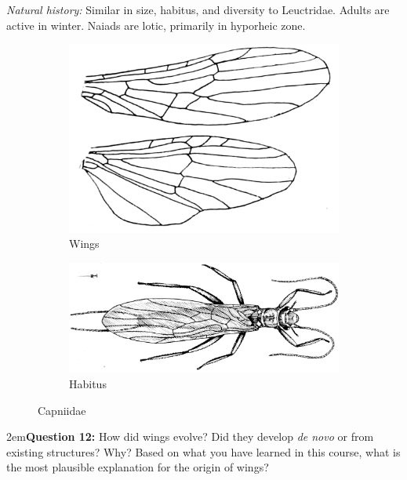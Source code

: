 \documentclass[letterpaper, 11pt]{article}
\begin{document}
\noindent{}\textit{Natural history:} Similar in size, habitus, and diversity to Leuctridae. Adults are active in winter. Naiads are lotic, primarily in hyporheic zone.\\

\begin{figure}[ht!]
    \centering
    \begin{subfigure}[ht!]{0.4\textwidth}
        \includegraphics[width=\textwidth]{CapniidWings}
        \caption{Wings \citep[modified from][Plate 47, Fig. 2]{bhl29875}}
        \label{fig:capniid1}
    \end{subfigure}
    \qquad
    \begin{subfigure}[ht!]{0.5\textwidth}
        \includegraphics[width=\textwidth]{CapniidHabitus}
        \caption{Habitus \citep[modified from][Fig. 28]{bhl29875}}
        \label{fig:capniid2}
    \end{subfigure}
    \caption{Capniidae}\label{fig:capniids}
\end{figure}

\hangindent2em\textbf{Question 12:} How did wings evolve? Did they develop \textit{de novo} or from existing structures? Why? Based on what you have learned in this course, what is the most plausible explanation for the origin of wings?
\end{document}

